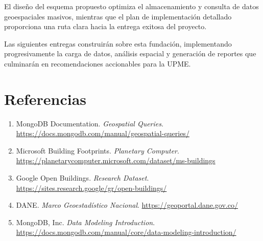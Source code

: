 \documentclass[12pt,a4paper]{article}
\begin{document}
El diseño del esquema propuesto optimiza el almacenamiento y consulta de datos geoespaciales masivos, mientras que el plan de implementación detallado proporciona una ruta clara hacia la entrega exitosa del proyecto.

Las siguientes entregas construirán sobre esta fundación, implementando progresivamente la carga de datos, análisis espacial y generación de reportes que culminarán en recomendaciones accionables para la UPME.

\section{Referencias}

\begin{enumerate}[leftmargin=*]
    \item MongoDB Documentation. \textit{Geospatial Queries}. \url{https://docs.mongodb.com/manual/geospatial-queries/}
    \item Microsoft Building Footprints. \textit{Planetary Computer}. \url{https://planetarycomputer.microsoft.com/dataset/ms-buildings}
    \item Google Open Buildings. \textit{Research Dataset}. \url{https://sites.research.google/gr/open-buildings/}
    \item DANE. \textit{Marco Geoestadístico Nacional}. \url{https://geoportal.dane.gov.co/}
    \item MongoDB, Inc. \textit{Data Modeling Introduction}. \url{https://docs.mongodb.com/manual/core/data-modeling-introduction/}
\end{enumerate}
\end{document}
